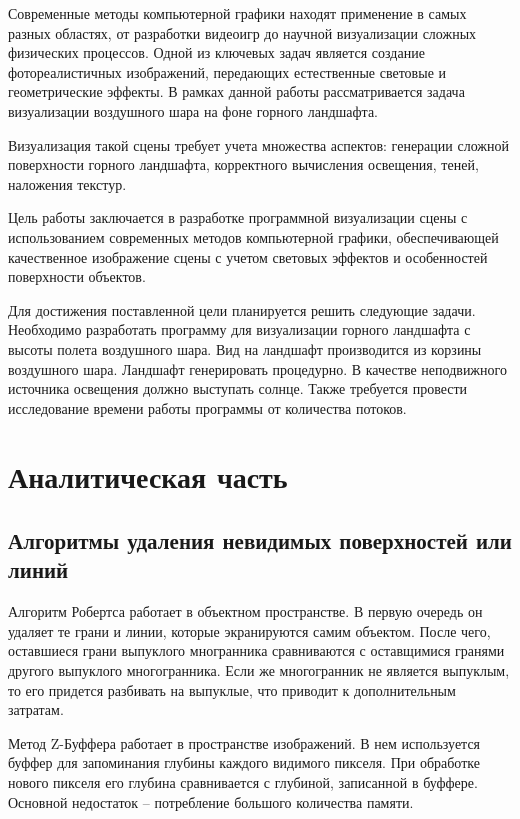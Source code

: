 

\usepackage{hyperref}


\setcounter{page}{2}
\renewcommand{\contentsname}{\hfill СОДЕРЖАНИЕ \hfill}
\tableofcontents

Современные методы компьютерной графики находят применение в самых разных областях, от разработки видеоигр до научной визуализации сложных физических процессов. Одной из ключевых задач является создание фотореалистичных изображений, передающих естественные световые и геометрические эффекты. В рамках данной работы рассматривается задача визуализации воздушного шара на фоне горного ландшафта.

Визуализация такой сцены требует учета множества аспектов: генерации сложной поверхности горного ландшафта, корректного вычисления освещения, теней, наложения текстур.

Цель работы заключается в разработке программной визуализации сцены с использованием современных методов компьютерной графики, обеспечивающей качественное изображение сцены с учетом световых эффектов и особенностей поверхности объектов. 

Для достижения поставленной цели планируется решить следующие задачи. Необходимо разработать программу для визуализации горного ландшафта с высоты полета воздушного шара. Вид на ландшафт производится из корзины воздушного шара. Ландшафт генерировать процедурно. В качестве неподвижного источника освещения должно выступать солнце. Также требуется провести исследование времени работы программы от количества потоков.

\chapter{Аналитическая часть}
\section{Алгоритмы удаления невидимых поверхностей или линий}
Алгоритм Робертса работает в объектном пространстве. В первую очередь он удаляет те грани и линии, которые экранируются самим объектом. После чего, оставшиеся грани выпуклого многранника сравниваются с оставщимися гранями другого выпуклого многогранника. Если же многогранник не является выпуклым, то его придется разбивать на выпуклые, что приводит к дополнительным затратам. 


Метод Z-Буффера работает в пространстве изображений. В нем используется буффер для запоминания глубины каждого видимого пикселя. При обработке нового пикселя его глубина сравнивается с глубиной, записанной в буффере. Основной недостаток -- потребление большого количества памяти. 

